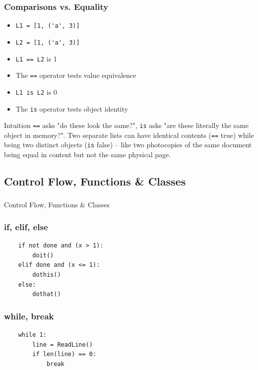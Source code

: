 \begin{frame}[fragile]\frametitle{Comparisons vs. Equality}
  \begin{itemize}
  \item \lstinline{L1 = [1, ('a', 3)]}
  \item \lstinline{L2 = [1, ('a', 3)]}
  \item \lstinline{L1 == L2} is 1
    \item The \lstinline{==} operator tests value equivalence
    \item \lstinline{L1 is L2} is 0

  \item The \lstinline{is} operator tests object identity
  \end{itemize}
\begin{block}{Intuition}
\lstinline{==} asks "do these look the same?", \lstinline{is} asks "are these literally the same object in memory?". Two separate lists can have identical contents (\lstinline{==} true) while being two distinct objects (\lstinline{is} false) -- like two photocopies of the same document being equal in content but not the same physical page.
\end{block}
\end{frame}

\subsection{Control Flow, Functions \& Classes}
\begin{frame}[fragile]\frametitle{}
\begin{center}
{\Large Control Flow, Functions \& Classes}
\end{center}
\end{frame}

\begin{frame}[fragile]\frametitle{if, elif, else}
  \begin{lstlisting}
	if not done and (x > 1):
		doit()
	elif done and (x <= 1):
		dothis()
	else:
		dothat()
  \end{lstlisting}
\end{frame}

\begin{frame}[fragile]\frametitle{while, break}
  \begin{lstlisting}
	while 1:
		line = ReadLine()
		if len(line) == 0:
			break
  \end{lstlisting}
\end{frame}

